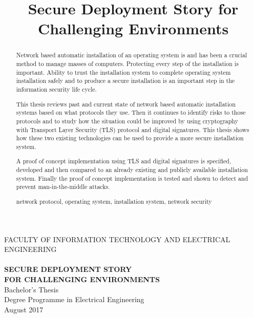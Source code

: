 \documentclass[a4paper,12pt,titlepage]{dithesis}
\title{Secure Deployment Story for Challenging Environments}
\begin{document}
\begin{titlepage}
	{{\small FACULTY OF INFORMATION TECHNOLOGY AND ELECTRICAL ENGINEERING}\\}
	\vspace{65 mm}
	{\textbf{\LARGE \getfirstname\ \getlastname}\\}
	\vspace{15 mm}
	{\textbf{\LARGE SECURE DEPLOYMENT STORY\\FOR CHALLENGING ENVIRONMENTS\\}}
	\vspace{70 mm}
	{\large {Bachelor's Thesis}\\}
	{\large {Degree Programme in Electrical Engineering}\\}
	{\large {August 2017}\\}
\end{titlepage}


\begin{abstract}

Network based automatic installation of an operating system is and has
been a crucial method to manage masses of computers. Protecting every
step of the installation is important. Ability to trust the
installation system to complete operating system installation safely
and to produce a secure installation is an important step in the
information security life cycle.

This thesis reviews past and current state of network based automatic
installation systems based on what protocols they use. Then it
continues to identify risks to those protocols and to study how the
situation could be improved by using cryptography with Transport Layer
Security (TLS) protocol and digital signatures. This thesis shows how
these two existing technologies can be used to provide a more secure
installation system.

A proof of concept implementation using TLS and digital signatures is
specified, developed and then compared to an already existing and
publicly available installation system. Finally the proof of concept
implementation is tested and shown to detect and prevent
man-in-the-middle attacks.

\keywords network protocol, operating system, installation system, network security
\end{abstract}
\end{document}
